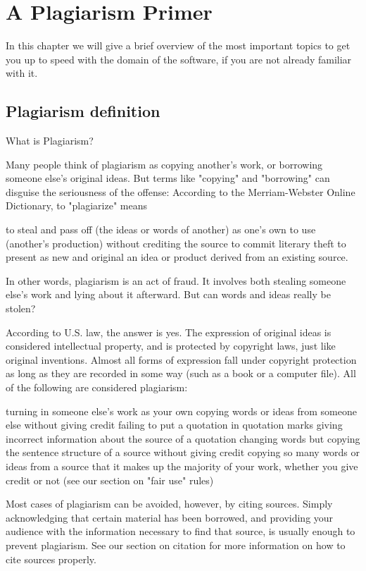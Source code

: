 ﻿\chapter{A Plagiarism Primer}\label{chap:plagOverview}
In this chapter we will give a brief overview of the most important topics to get you up to speed with the domain of the software, if you are not already familiar with it.

\section{Plagiarism definition} 
What is Plagiarism?

Many people think of plagiarism as copying another's work, or borrowing someone else's original ideas. But terms like "copying" and "borrowing" can disguise the seriousness of the offense:
According to the Merriam-Webster Online Dictionary, to "plagiarize" means

    to steal and pass off (the ideas or words of another) as one's own
    to use (another's production) without crediting the source
    to commit literary theft
    to present as new and original an idea or product derived from an existing source.

In other words, plagiarism is an act of fraud. It involves both stealing someone else's work and lying about it afterward.
But can words and ideas really be stolen?

According to U.S. law, the answer is yes. The expression of original ideas is considered intellectual property, and is protected by copyright laws, just like original inventions. Almost all forms of expression fall under copyright protection as long as they are recorded in some way (such as a book or a computer file).
All of the following are considered plagiarism:

    turning in someone else's work as your own
    copying words or ideas from someone else without giving credit
    failing to put a quotation in quotation marks
    giving incorrect information about the source of a quotation
    changing words but copying the sentence structure of a source without giving credit
    copying so many words or ideas from a source that it makes up the majority of your work, whether you give credit or not (see our section on "fair use" rules)

Most cases of plagiarism can be avoided, however, by citing sources. Simply acknowledging that certain material has been borrowed, and providing your audience with the information necessary to find that source, is usually enough to prevent plagiarism. See our section on citation for more information on how to cite sources properly.

